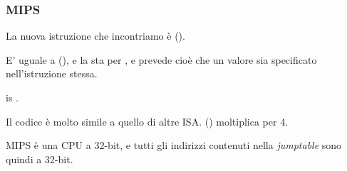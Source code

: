 \subsubsection{MIPS}




La nuova istruzione che incontriamo è  ().

E' uguale a  (), e la  sta per , 
e prevede cioè che un valore sia specificato nell'istruzione stessa.

 is .

Il codice è molto simile a quello di altre \ac{ISA}.
 () moltiplica per 4.

MIPS è una CPU a 32-bit, e tutti gli indirizzi contenuti nella \emph{jumptable} sono quindi a 32-bit.

